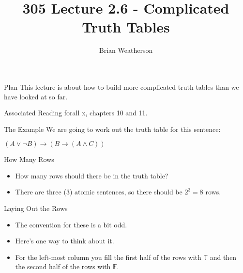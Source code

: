 \documentclass[
  ignorenonframetext,
]{beamer}
\title{305 Lecture 2.6 - Complicated Truth Tables}
\author{Brian Weatherson}
\date{}
\providecommand{\tightlist}{%
  \setlength{\itemsep}{0pt}\setlength{\parskip}{0pt}}
\renewcommand{\,}{\text{, }}
\renewenvironment*{quote}	
	{\list{}{\rightmargin   \leftmargin} \item } 	
	{\endlist }
\def\True{\mathbb{T}}
\def\False{\mathbb{F}}
\begin{document}
\frame{\titlepage}

\begin{frame}{Plan}
\protect\hypertarget{plan}{}
This lecture is about how to build more complicated truth tables than we
have looked at so far.
\end{frame}

\begin{frame}{Associated Reading}
\protect\hypertarget{associated-reading}{}
forall x, chapters 10 and 11.
\end{frame}

\begin{frame}{The Example}
\protect\hypertarget{the-example}{}
We are going to work out the truth table for this sentence:

\begin{quote}
\((A \vee \neg B) \rightarrow (B \rightarrow (A \wedge C))\)
\end{quote}
\end{frame}

\begin{frame}{How Many Rows}
\protect\hypertarget{how-many-rows}{}
\begin{itemize}[<+->]
\tightlist
\item
  How many rows should there be in the truth table?
\item
  There are three (3) atomic sentences, so there should be \(2^3 = 8\)
  rows.
\end{itemize}
\end{frame}

\begin{frame}{Laying Out the Rows}
\protect\hypertarget{laying-out-the-rows}{}
\begin{itemize}
\tightlist
\item
  The convention for these is a bit odd.
\item
  Here's one way to think about it.
\item
  For the left-most column you fill the first half of the rows with
  \(\True\) and then the second half of the rows with \(\False\).
\end{itemize}
\end{frame}
\end{document}
